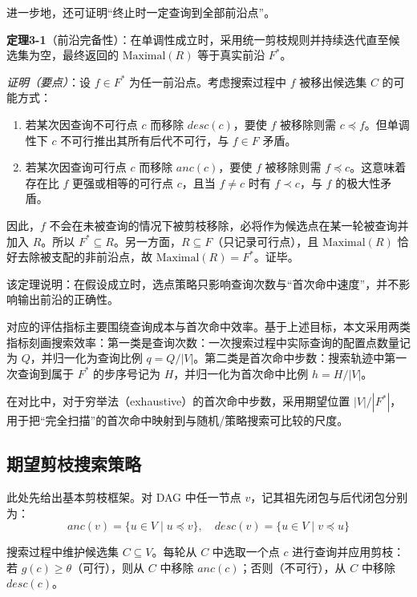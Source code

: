 \documentclass[UTF8,a4paper,12pt,twoside]{ctexart}  %
\begin{document}
进一步地，还可证明``终止时一定查询到全部前沿点''。

\textbf{定理3-1}（前沿完备性）：在单调性成立时，采用统一剪枝规则并持续迭代直至候选集为空，最终返回的
\(\text{Maximal}(R)\) 等于真实前沿 \(F^*\)。

\emph{证明（要点）}：设 \(f\in F^*\) 为任一前沿点。考虑搜索过程中 \(f\)
被移出候选集 \(C\) 的可能方式：
\begin{enumerate}
  \def\labelenumi{\arabic{enumi}.}
  \item
        若某次因查询不可行点 \(c\) 而移除 \(desc(c)\)，要使 \(f\) 被移除则需
        \(c\preceq f\)。但单调性下 \(c\) 不可行推出其所有后代不可行，与
        \(f\in F\) 矛盾。
  \item
        若某次因查询可行点 \(c\) 而移除 \(anc(c)\)，要使 \(f\) 被移除则需
        \(f\preceq c\)。这意味着存在比 \(f\) 更强或相等的可行点 \(c\)，且当
        \(f\ne c\) 时有 \(f\prec c\)，与 \(f\) 的极大性矛盾。
\end{enumerate}

因此，\(f\)
不会在未被查询的情况下被剪枝移除，必将作为候选点在某一轮被查询并加入
\(R\)。所以
\(F^*\subseteq R\)。另一方面，\(R\subseteq F\)（只记录可行点），且
\(\text{Maximal}(R)\) 恰好去除被支配的非前沿点，故
\(\text{Maximal}(R)=F^*\)。证毕。

该定理说明：在假设成立时，选点策略只影响查询次数与``首次命中速度''，并不影响输出前沿的正确性。

对应的评估指标主要围绕查询成本与首次命中效率。基于上述目标，本文采用两类指标刻画搜索效率：第一类是查询次数：一次搜索过程中实际查询的配置点数量记为
\(Q\)，并归一化为查询比例
\(q=Q/|V|\)。第二类是首次命中步数：搜索轨迹中第一次查询到属于 \(F^*\)
的步序号记为 \(H\)，并归一化为首次命中比例 \(h=H/|V|\)。

在对比中，对于穷举法（exhaustive）的首次命中步数，采用期望位置
\(|V|/|F^*|\)，用于把``完全扫描''的首次命中映射到与随机/策略搜索可比较的尺度。

\subsection{期望剪枝搜索策略}

此处先给出基本剪枝框架。对 DAG 中任一节点 \(v\)，记其祖先闭包与后代闭包分别为：
\begin{equation}
  anc(v) = \{u \in V \mid u \preceq v\}, \quad desc(v) = \{u \in V \mid v \preceq u\}
\end{equation}

搜索过程中维护候选集 \(C \subseteq V\)。每轮从 \(C\) 中选取一个点 \(c\)
进行查询并应用剪枝：若 \(g(c)\ge\theta\)（可行），则从 \(C\) 中移除
\(anc(c)\)；否则（不可行），从 \(C\) 中移除 \(desc(c)\)。
\end{document}
